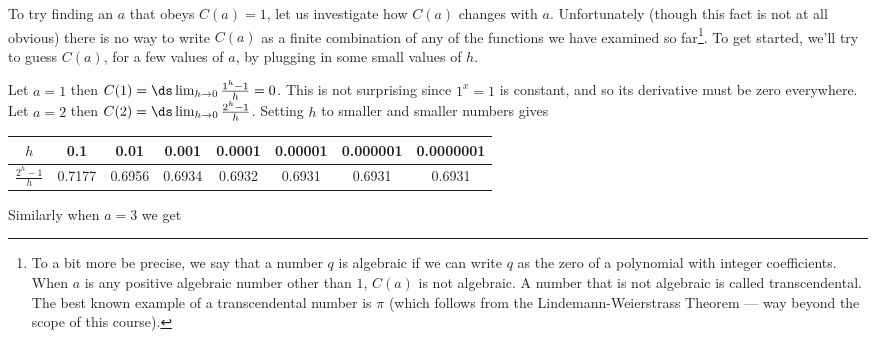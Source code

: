 To try finding an $a$ that obeys $C(a)=1$, let us investigate how $C(a)$ changes
with
$a$. Unfortunately (though this fact is not at all obvious) there is no way to
write
$C(a)$ as a finite combination of any of the functions we have examined
so far\footnote{To a bit more be precise, we say that a number $q$ is algebraic
if we can
write $q$ as the zero of a polynomial with integer coefficients. When $a$ is any
positive
algebraic number other than $1$, $C(a)$ is not algebraic. A number that is not
algebraic is
called transcendental. The best known example of a transcendental number is
$\pi$ (which
follows from the Lindemann-Weierstrass Theorem --- way beyond the scope of this
course).}. To get started, we'll try to guess $C(a)$, for a few values of
$a$, by plugging in some small values of $h$.
\begin{eg}\label{eg log est}
Let $a =1$ then $C(1) = \ds \lim_{h \to 0} \frac{1^h-1}{h} = 0$. This is not
surprising
since $1^x=1$ is constant, and so its derivative must be zero everywhere. Let $a
=2$
then $C(2) = \ds \lim_{h \to 0} \frac{2^h-1}{h}$. Setting $h$ to smaller and
smaller
numbers gives
\begin{center}
   \renewcommand{\arraystretch}{1.2}
   \begin{tabular}{|c||c|c|c|c|c|c|c|}
       \hline
       $h$ & 0.1 & 0.01 & 0.001 & 0.0001 & 0.00001 & 0.000001 & 0.0000001 \\
       \hline
       $\tfrac{2^h-1}{h}$ & 0.7177 & 0.6956 & 0.6934 & 0.6932 &
             0.6931 & 0.6931 & 0.6931 \\ \hline
     \end{tabular}
     \renewcommand{\arraystretch}{1.0}
\end{center}
Similarly when $a=3$ we get

\end{eg}
